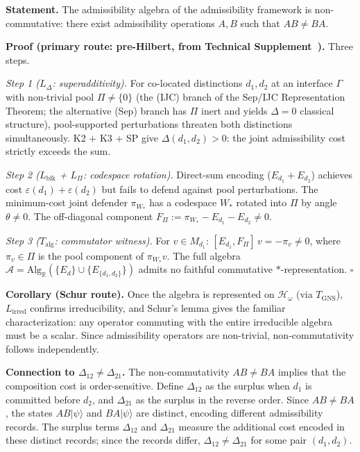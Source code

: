 \documentclass[11pt]{article}
\begin{document}
\begin{tcolorbox}[apfbox, title={Lemma $L_{\Delta\to\mathrm{nc}}$ (Interference Non-Closure Implies Non-Commutativity)}]
\textbf{Statement.}  The admissibility algebra of the admissibility framework is non-commutative: there exist admissibility operations $A, B$ such that $AB \ne BA$.

\smallskip\noindent\textbf{Proof (primary route: pre-Hilbert, from Technical Supplement~\cite{BrookeSupplement}).}  Three steps.

\textit{Step 1 ($L_\Delta$: superadditivity).}  For co-located distinctions $d_1, d_2$ at an interface $\Gamma$ with non-trivial pool $\Pi \ne \{0\}$ (the (IJC) branch of the Sep/IJC Representation Theorem; the alternative (Sep) branch has $\Pi$ inert and yields $\Delta = 0$ classical structure), pool-supported perturbations threaten both distinctions simultaneously.  K2 + K3 + SP give $\Delta(d_1, d_2) > 0$: the joint admissibility cost strictly exceeds the sum.

\textit{Step 2 ($L_{\mathrm{blk}}$ + $L_\Pi$: codespace rotation).}  Direct-sum encoding ($E_{d_1} + E_{d_2}$) achieves cost $\varepsilon(d_1) + \varepsilon(d_2)$ but fails to defend against pool perturbations.  The minimum-cost joint defender $\pi_{W_*}$ has a codespace $W_*$ rotated into $\Pi$ by angle $\theta \ne 0$.  The off-diagonal component $F_\Pi := \pi_{W_*} - E_{d_1} - E_{d_2} \ne 0$.

\textit{Step 3 ($T_{\mathrm{alg}}$: commutator witness).}  For $v \in M_{d_1}$: $[E_{d_1}, F_\Pi]\,v = -\pi_v \ne 0$, where $\pi_v \in \Pi$ is the pool component of $\pi_{W_*} v$.  The full algebra $\mathcal{A} = \mathrm{Alg}_\mathbb{R}(\{E_d\} \cup \{E_{\{d_1,d_2\}}\})$ admits no faithful commutative $*$-representation.  $\square$

\smallskip\noindent\textbf{Corollary (Schur route).}  Once the algebra is represented on $\mathcal{H}_\omega$ (via $T_{\mathrm{GNS}}$), $L_{\mathrm{irred}}$ confirms irreducibility, and Schur's lemma gives the familiar characterization: any operator commuting with the entire irreducible algebra must be a scalar.  Since admissibility operators are non-trivial, non-commutativity follows independently.

\smallskip\noindent\textbf{Connection to $\Delta_{12} \ne \Delta_{21}$.}  The non-commutativity $AB \ne BA$ implies that the composition cost is order-sensitive.  Define $\Delta_{12}$ as the surplus when $d_1$ is committed before $d_2$, and $\Delta_{21}$ as the surplus in the reverse order.  Since $AB \ne BA$, the states $AB|\psi\rangle$ and $BA|\psi\rangle$ are distinct, encoding different admissibility records.  The surplus terms $\Delta_{12}$ and $\Delta_{21}$ measure the additional cost encoded in these distinct records; since the records differ, $\Delta_{12} \ne \Delta_{21}$ for some pair $(d_1, d_2)$.


\end{tcolorbox}
\end{document}
